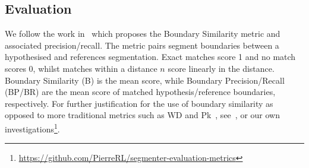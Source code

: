 \subsection{Evaluation}\label{evaluation}

We follow the work in~\cite{fournier-2013-B} which proposes the Boundary Similarity metric and associated precision/recall. The metric pairs segment boundaries between a hypothesised and references segmentation. Exact matches score 1 and no match scores 0, whilst matches within a distance $n$ score linearly in the distance. Boundary Similarity (B) is the mean score, while Boundary Precision/Recall (BP/BR) are the mean score of matched hypothesis/reference boundaries, respectively. For further justification for the use of boundary similarity as opposed to more traditional metrics such as WD and Pk~\cite{HearstW2002}, see~\cite{fournier-2013-B}, or our own investigations\footnote{\url{https://github.com/PierreRL/segmenter-evaluation-metrics}}.

